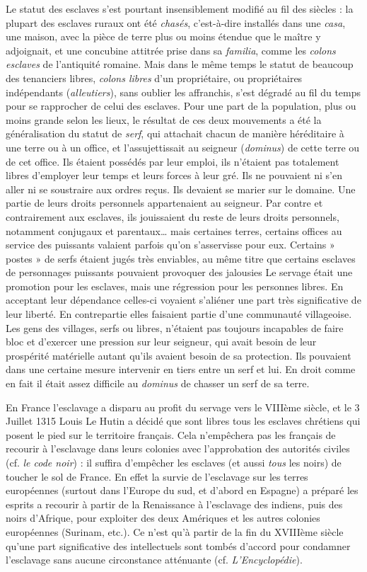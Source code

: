  Le statut des esclaves s'est pourtant insensiblement modifié au fil des siècles : la plupart des esclaves ruraux ont été \emph{chasés}, c'est-à-dire installés dans une \emph{casa}, une maison, avec la pièce de terre plus ou moins étendue que le maître y adjoignait, et une concubine attitrée prise dans sa \emph{familia}, comme les \emph{colons esclaves} de l'antiquité romaine. Mais dans le même temps le statut de beaucoup des tenanciers libres, \emph{colons libres} d'un propriétaire, ou propriétaires indépendants (\emph{alleutiers}), sans oublier les affranchis, s'est dégradé au fil du temps pour se rapprocher de celui des esclaves. Pour une part de la population, plus ou moins grande selon les lieux, le résultat de ces deux mouvements a été la généralisation du statut de \emph{serf}, qui attachait chacun de manière héréditaire à une terre ou à un office, et l'assujettissait au seigneur (\emph{dominus}) de cette terre ou de cet office. 
 Ils étaient possédés par leur emploi, ils n'étaient pas totalement libres d'employer leur temps et leurs forces à leur gré. Ils ne pouvaient ni s'en aller ni se soustraire aux ordres reçus. Ils devaient se marier sur le domaine. Une partie de leurs droits personnels appartenaient au seigneur. Par contre et contrairement aux esclaves, ils jouissaient du reste de leurs droits personnels, notamment conjugaux et parentaux… mais certaines terres, certains offices au service des puissants valaient parfois qu'on s'asservisse pour eux. Certains » postes » de serfs étaient jugés très enviables, au même titre que certains esclaves de personnages puissants pouvaient provoquer des jalousies
 Le servage était une promotion pour les esclaves, mais une régression pour les personnes libres. En acceptant leur dépendance celles-ci voyaient s'aliéner une part très significative de leur liberté. En contrepartie elles faisaient partie d'une communauté villageoise. Les gens des villages, serfs ou libres, n'étaient pas toujours incapables de faire bloc et d'exercer une pression sur leur seigneur, qui avait besoin de leur prospérité matérielle autant qu'ils avaient besoin de sa protection. Ils pouvaient dans une certaine mesure intervenir en tiers entre un serf et lui. En droit comme en fait il était assez difficile au \emph{dominus} de chasser un serf de sa terre. 
 
 En France l'esclavage a disparu au profit du servage vers le VIIIème siècle, et le 3 Juillet 1315 Louis Le Hutin a décidé que sont libres tous les esclaves chrétiens qui posent le pied sur le territoire français. 
 Cela n'empêchera pas les français de recourir à l'esclavage dans leurs colonies avec l'approbation des autorités civiles (cf. \emph{le code noir}) : il suffira d'empêcher les esclaves (et aussi \emph{tous} les noirs) de toucher le sol de France. En effet la survie de l'esclavage sur les terres européennes (surtout dans l'Europe du sud, et d'abord en Espagne) a préparé les esprits a recourir à partir de la Renaissance à l'esclavage des indiens, puis des noirs d'Afrique, pour exploiter des deux Amériques et les autres colonies européennes (Surinam, etc.). 
 Ce n'est qu'à partir de la fin du XVIIIème siècle qu'une part significative des intellectuels sont tombés d'accord pour condamner l'esclavage sans aucune circonstance atténuante (cf. \emph{L'Encyclopédie}).